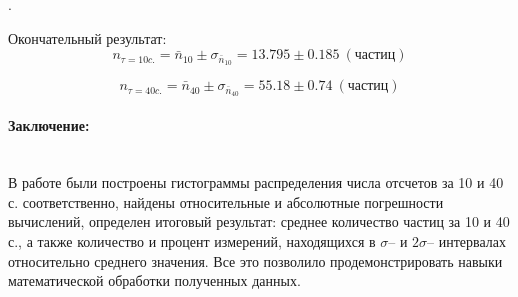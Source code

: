 \documentclass[a4paper, 12pt]{article}
\newcommand{\parag}[1]{\paragraph*{#1:}}
\newcounter{Points}
\newcommand{\point}{\arabic{Points}. \addtocounter{Points}{1}}
\begin{document}
\point Окончательный результат:
\[
    n_{\tau=10c.} = \bar{n}_{10} \pm \sigma_{\bar{n}_{10}} = 13.795 \pm 0.185 ~ (частиц)
\]

\[
    n_{\tau=40c.} = \bar{n}_{40} \pm \sigma_{\bar{n}_{40}} = 55.18 \pm 0.74 ~ (частиц)
\]

\parag {Заключение} ~\\
В работе были построены гистограммы распределения числа отсчетов за 10 и 40 с. соответственно, найдены относительные и абсолютные погрешности вычислений, определен итоговый результат: среднее количество частиц за 10 и 40 с., а также количество и процент измерений, находящихся в $\sigma$-- и $2\sigma$-- интервалах относительно среднего значения. Все это позволило продемонстрировать навыки математической обработки полученных данных.
\end{document}
